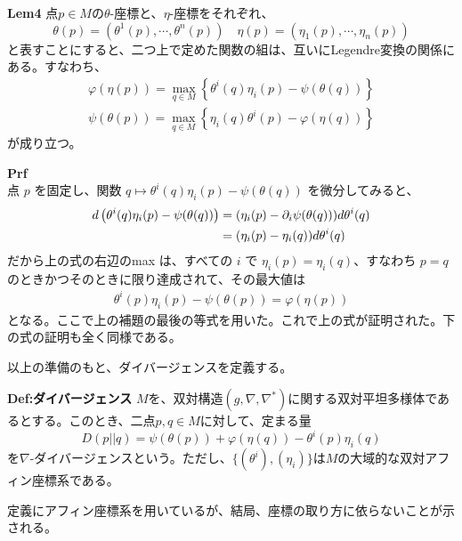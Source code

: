 \documentclass[a4paper,11pt]{jsarticle}
\numberwithin{equation}{section}
\begin{document}
\begin{itembox}[l]{\textbf{Lem4}}
    点$p \in M$の$\theta$-座標と、$\eta$-座標をそれぞれ、
    \begin{equation}
        \theta(p) = (\theta^1(p),\cdots,\theta^n(p)) \quad \eta(p) = (\eta_1(p),\cdots,\eta_n(p))
    \end{equation}
    と表すことにすると、二つ上で定めた関数の組は、互いにLegendre変換の関係にある。すなわち、
    \begin{align}
        \varphi(\eta(p)) = \underset{q \in M}{\max} \left\{ \theta^i(q)\eta_i(p) - \psi(\theta(q)) \right\}\\
        \psi(\theta(p)) = \underset{q \in M}{\max} \left\{ \eta_i(q)\theta^i(p) - \varphi(\eta(q)) \right\}
    \end{align}
    が成り立つ。
\end{itembox}
\textbf{Prf}\\
点 \(p\) を固定し、関数 \(q \mapsto \theta^i(q) \eta_i(p) - \psi(\theta(q))\) を微分してみると、
\begin{align}
d \left( \theta^i(q) \eta_i(p) - \psi(\theta(q)) \right) &= (\eta_i(p) - \partial_i \psi(\theta(q))) d\theta^i(q) \notag \\
&= (\eta_i(p) - \eta_i(q)) d\theta^i(q)
\end{align}
だから上の式の右辺のmax は、すべての \(i\) で \(\eta_i(p) = \eta_i(q)\)、すなわち \(p = q\) のときかつそのときに限り達成されて、その最大値は
\begin{align}
\theta^i(p) \eta_i(p) - \psi(\theta(p)) = \varphi(\eta(p))
\end{align}
となる。ここで上の補題の最後の等式を用いた。これで上の式が証明された。下の式の証明も全く同様である。 \hfill\qedsymbol


以上の準備のもと、ダイバージェンスを定義する。
\begin{itembox}[l]{\textbf{Def:ダイバージェンス}}
    $M$を、双対構造$(g,\nabla,\nabla^*)$に関する双対平坦多様体であるとする。このとき、二点$p,q \in M$に対して、定まる量
    \begin{equation}
        D(p||q) = \psi(\theta(p)) + \varphi(\eta(q)) - \theta^i(p)\eta_i(q)
    \end{equation}
    を$\nabla$-ダイバージェンスという。ただし、$\{(\theta ^i),(\eta_i)\}$は$M$の大域的な双対アフィン座標系である。
\end{itembox}
定義にアフィン座標系を用いているが、結局、座標の取り方に依らないことが示される。\\
\end{document}
